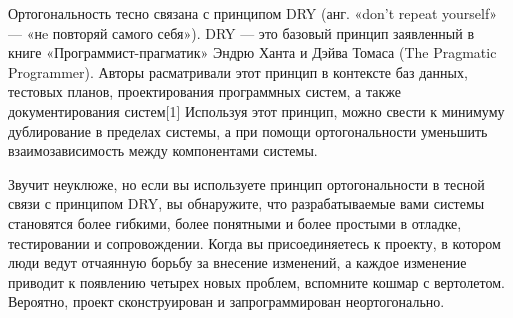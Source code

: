 Ортогональность тесно связана с принципом DRY (анг. «don't repeat yourself» —
«нe повторяй самого себя»). DRY — это базовый принцип заявленный в книге
«Программист-прагматик» Эндрю Ханта и Дэйва Томаса (The Pragmatic Programmer).
Авторы расматривали этот принцип в контексте баз данных, тестовых планов,
проектирования программных систем, а также документирования систем[1] Используя
этот принцип, можно свести к минимуму дублирование в пределах системы, а при
помощи ортогональности уменьшить взаимозависимость между компонентами системы.

Звучит неуклюже, но если вы используете принцип ортогональности в тесной связи с
принципом DRY, вы обнаружите, что разрабатываемые вами системы становятся более
гибкими, более понятными и более простыми в отладке, тестировании и
сопровождении. Когда вы присоединяетесь к проекту, в котором люди ведут
отчаянную борьбу за внесение изменений, а каждое изменение приводит к появлению
четырех новых проблем, вспомните кошмар с вертолетом. Вероятно, проект
сконструирован и запрограммирован неортогонально.


